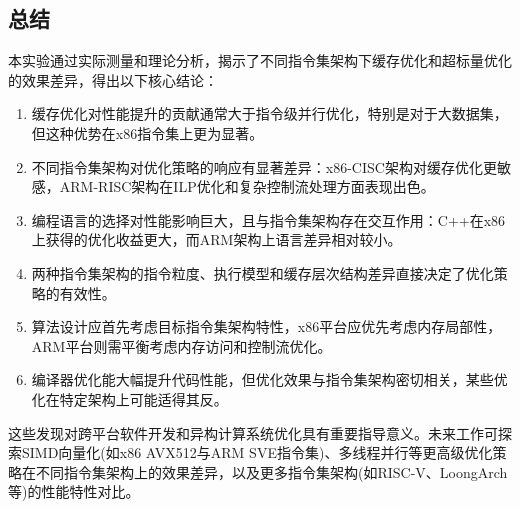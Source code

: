 \documentclass[a4paper,colorlinks=true,linkcolor=blue,urlcolor=blue,citecolor=green,bookmarks=true]{article}
\begin{document}
\subsection{总结}

本实验通过实际测量和理论分析，揭示了不同指令集架构下缓存优化和超标量优化的效果差异，得出以下核心结论：

\begin{enumerate}
  \item 缓存优化对性能提升的贡献通常大于指令级并行优化，特别是对于大数据集，但这种优势在x86指令集上更为显著。
  
  \item 不同指令集架构对优化策略的响应有显著差异：x86-CISC架构对缓存优化更敏感，ARM-RISC架构在ILP优化和复杂控制流处理方面表现出色。
  
  \item 编程语言的选择对性能影响巨大，且与指令集架构存在交互作用：C++在x86上获得的优化收益更大，而ARM架构上语言差异相对较小。
  
  \item 两种指令集架构的指令粒度、执行模型和缓存层次结构差异直接决定了优化策略的有效性。
  
  \item 算法设计应首先考虑目标指令集架构特性，x86平台应优先考虑内存局部性，ARM平台则需平衡考虑内存访问和控制流优化。
  
  \item 编译器优化能大幅提升代码性能，但优化效果与指令集架构密切相关，某些优化在特定架构上可能适得其反。
\end{enumerate}

这些发现对跨平台软件开发和异构计算系统优化具有重要指导意义。未来工作可探索SIMD向量化(如x86 AVX512与ARM SVE指令集)、多线程并行等更高级优化策略在不同指令集架构上的效果差异，以及更多指令集架构(如RISC-V、LoongArch等)的性能特性对比。

\clearpage
\def\bibsection{
  \section*{\refname\markboth{\refname}{\refname}}%
  \addcontentsline{toc}{section}{\refname}%
  \begingroup
    \fontsize{12}{14}\selectfont%
    \vspace{0.8em}
  \endgroup
}

\nocite{*}


\end{document}

